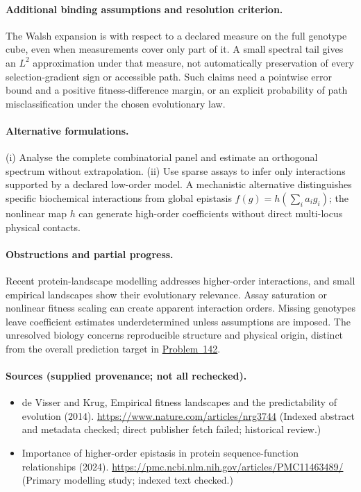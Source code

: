 \documentclass[11pt]{article}
\begin{document}
\paragraph{Additional binding assumptions and resolution criterion.} The Walsh expansion is with respect to a declared measure on the full genotype cube, even when measurements cover only part of it. A small spectral tail gives an $L^2$ approximation under that measure, not automatically preservation of every selection-gradient sign or accessible path. Such claims need a pointwise error bound and a positive fitness-difference margin, or an explicit probability of path misclassification under the chosen evolutionary law.

\paragraph{Alternative formulations.} (i) Analyse the complete combinatorial panel and estimate an orthogonal spectrum without extrapolation. (ii) Use sparse assays to infer only interactions supported by a declared low-order model. A mechanistic alternative distinguishes specific biochemical interactions from global epistasis $f(g)=h(\sum_i a_i g_i)$; the nonlinear map $h$ can generate high-order coefficients without direct multi-locus physical contacts.
\paragraph{Obstructions and partial progress.} Recent protein-landscape modelling addresses higher-order interactions, and small empirical landscapes show their evolutionary relevance. Assay saturation or nonlinear fitness scaling can create apparent interaction orders. Missing genotypes leave coefficient estimates underdetermined unless assumptions are imposed. The unresolved biology concerns reproducible structure and physical origin, distinct from the overall prediction target in \href{https://we-solve.github.io/problems/genome-scale-fitness-landscape-cd180341/}{Problem~142}.
\paragraph{Sources (supplied provenance; not all rechecked).} \begin{itemize}
\item de Visser and Krug, Empirical fitness landscapes and the predictability of evolution (2014). \url{https://www.nature.com/articles/nrg3744} (Indexed abstract and metadata checked; direct publisher fetch failed; historical review.)
\item Importance of higher-order epistasis in protein sequence-function relationships (2024). \url{https://pmc.ncbi.nlm.nih.gov/articles/PMC11463489/} (Primary modelling study; indexed text checked.)
\end{itemize}
\end{document}
